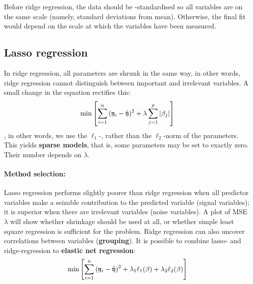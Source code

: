 \begin{refsection}
Before ridge regression, the data should be -standardised so all variables are on the same scale (namely, standard deviations from mean). Otherwise, the final fit would depend on the scale at which the variables have been measured.

\subsection{Lasso regression}\label{text:lasso}

In ridge regression, all parameters are shrunk in the same way, in other words, ridge regression cannot distinguish between important and irrelevant variables. A small change in the equation rectifies this:
\begin{equation}
  \min\left[\sum_{i=1}^n{(\mathfrak{y}_i - \hat{\mathfrak{y}})^2} + \lambda \sum_{j=1}^p{|\beta_j|} \right]
\end{equation}
, in other words, we use the \(\ell_1 \)-, rather than the \(\ell_2 \)-norm of the parameters. This yields \textbf{sparse models}, that is, some parameters may be set to exactly zero. Their number depends on \(\lambda \).

\paragraph{Method selection:} Lasso regression performs slightly poorer than ridge regression when all predictor variables make a seizable contribution to the predicted variable (signal variables); it is superior when there are irrelevant variables (noise variables). A plot of \acs{MSE}  \( \lambda \) will show whether shrinkage should be used at all, or whether simple least square regression is sufficient for the problem. Ridge regression can also uncover correlations between variables (\textbf{grouping}). It is possible to combine lasso- and ridge-regression to \textbf{elastic net regression}:
\begin{equation}
  \min\left[\sum_{i=1}^n{(\mathfrak{y}_i - \hat{\mathfrak{y}})^2} + \lambda_1 \ell_1(\beta) + \lambda_2 \ell_2(\beta) \right]
\end{equation}

\printbibliography[heading=subbibliography]
\end{refsection}
